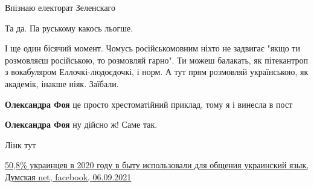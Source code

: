  
Впізнаю електорат Зеленскаго


Та да. Па руському какось льогше.

І ще один бісячий момент. Чомусь російськомовним ніхто не задвигає "якщо ти
розмовляєш російською, то розмовляй гарно". Ти можеш балакать, як пітекантроп з
вокабуляром Еллочкі-людоєдочкі, і норм. А тут прям розмовляй українською, як
академік, інакше ніяк. Заїбали.

\begin{itemize}
 
\textbf{Олександра Фоя} це просто хрестоматійний приклад, тому я і винесла в пост

 
\textbf{Олександра Фоя} ну дійсно ж! Саме так.
\end{itemize}

 
Лінк тут

\href{https://www.facebook.com/205838236106547/posts/4827999290557062/}{%
50,8\% украинцев в 2020 году в быту использовали для общения украинский язык, %
Думская net, facebook, 06.09.2021%
}


